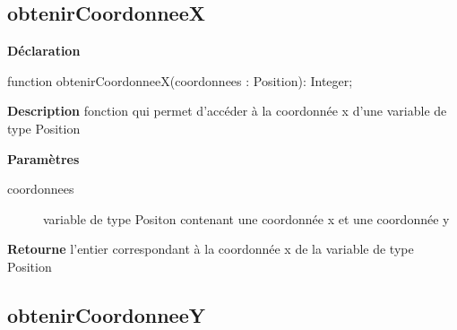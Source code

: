 \documentclass{report}
\newif\ifpdf
\begin{document}
\subsection*{obtenirCoordonneeX}
\fi
\label{Types-obtenirCoordonneeX}
\begin{list}{}{
\setlength{\itemindent}{0cm}
\setlength{\listparindent}{0cm}
\setlength{\leftmargin}{\evensidemargin}
\addtolength{\leftmargin}{\tmplength}
\settowidth{\labelsep}{X}
\addtolength{\leftmargin}{\labelsep}
\setlength{\labelwidth}{\tmplength}
}
\item[\textbf{Déclaration}\hfill]
\ifpdf
\begin{flushleft}
\fi
\begin{ttfamily}
function obtenirCoordonneeX(coordonnees : Position): Integer;\end{ttfamily}

\ifpdf
\end{flushleft}
\fi

\par
\item[\textbf{Description}]
fonction qui permet d'accéder à la coordonnée x d'une variable de type Position  \par
\item[\textbf{Paramètres}]
\begin{description}
\item[coordonnees] variable de type Positon contenant une coordonnée x et une coordonnée y
\end{description}
\item[\textbf{Retourne}]l'entier correspondant à la coordonnée x de la variable de type Position


\end{list}
\ifpdf
\subsection*{\large{\textbf{obtenirCoordonneeY}}\normalsize\hspace{1ex}\hrulefill}
\else
\end{document}
